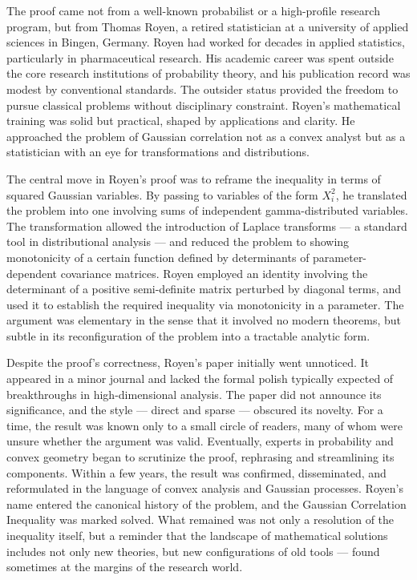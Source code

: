 The proof came not from a well-known probabilist or a high-profile research program, but from Thomas Royen, a retired statistician at a university of applied sciences in Bingen, Germany. Royen had worked for decades in applied statistics, particularly in pharmaceutical research. His academic career was spent outside the core research institutions of probability theory, and his publication record was modest by conventional standards. The outsider status provided the freedom to pursue classical problems without disciplinary constraint. Royen's mathematical training was solid but practical, shaped by applications and clarity. He approached the problem of Gaussian correlation not as a convex analyst but as a statistician with an eye for transformations and distributions.

The central move in Royen's proof was to reframe the inequality in terms of squared Gaussian variables. By passing to variables of the form \( X_i^2 \), he translated the problem into one involving sums of independent gamma-distributed variables. The transformation allowed the introduction of Laplace transforms — a standard tool in distributional analysis — and reduced the problem to showing monotonicity of a certain function defined by determinants of parameter-dependent covariance matrices. Royen employed an identity involving the determinant of a positive semi-definite matrix perturbed by diagonal terms, and used it to establish the required inequality via monotonicity in a parameter. The argument was elementary in the sense that it involved no modern theorems, but subtle in its reconfiguration of the problem into a tractable analytic form.

Despite the proof’s correctness, Royen’s paper initially went unnoticed. It appeared in a minor journal and lacked the formal polish typically expected of breakthroughs in high-dimensional analysis. The paper did not announce its significance, and the style — direct and sparse — obscured its novelty. For a time, the result was known only to a small circle of readers, many of whom were unsure whether the argument was valid. Eventually, experts in probability and convex geometry began to scrutinize the proof, rephrasing and streamlining its components. Within a few years, the result was confirmed, disseminated, and reformulated in the language of convex analysis and Gaussian processes. Royen’s name entered the canonical history of the problem, and the Gaussian Correlation Inequality was marked solved. What remained was not only a resolution of the inequality itself, but a reminder that the landscape of mathematical solutions includes not only new theories, but new configurations of old tools — found sometimes at the margins of the research world.
\newpage

